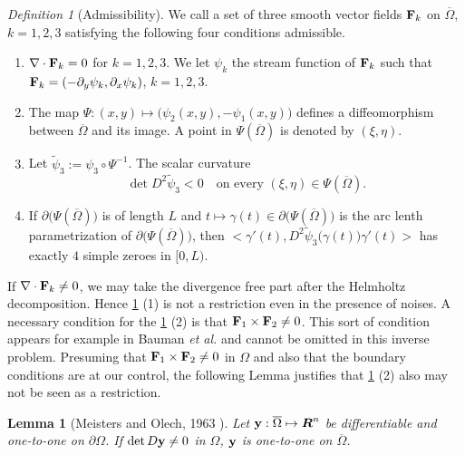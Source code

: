 \documentclass[11pt]{amsart}
\theoremstyle{plain}
\newtheorem{Lem}[Thm]{Lemma}
\theoremstyle{remark}
\newtheorem{Def}[Thm]{Definition}
\numberwithin{equation}{section}
\numberwithin{Thm}{section}
\def\R{\mbox{\boldmath$R$}}
\def\F{{\bf F}}
\def\y{{\bf y}}
\begin{document}
\begin{Def}[Admissibility] \label{def:adm3} We call a set of three smooth vector fields $\F_k$ on $\overline\Omega$, $k=1,2,3$ satisfying the following four conditions admissible.
\begin{enumerate}
  \item $\nabla\cdot\F_k=0$ for $k=1,2,3$. We let $\psi_k$ the stream function of $\F_k$ such that $\F_k=(-\partial_y\psi_k,\partial_x\psi_k)$, $k=1,2,3$.
   \item The map $\Psi: (x,y) \mapsto \big(\psi_2(x,y), -\psi_1(x,y)\big)$ defines a diffeomorphism between $\overline\Omega$ and its image. A point in $\Psi(\overline\Omega)$ is denoted by $(\xi,\eta)$. %
%    
  \item \label{strict} Let $\tilde{\psi}_3:=\psi_3 \circ \Psi^{-1}$. The scalar curvature
\begin{equation}\label{strictInquality}
\det D^2_{}\tilde{\psi}_3  < 0 \quad \text{on every $(\xi,\eta) \in \Psi(\overline\Omega)$.}
\end{equation}
  \item If $\partial\big( \Psi(\overline\Omega)\big)$ is of length $L$ and $t \mapsto \gamma(t)\in \partial\big( \Psi(\overline\Omega)\big)$ is the arc lenth parametrization of  $\partial\big( \Psi(\overline\Omega)\big)$, then $\big<\gamma'(t), D^2 \tilde\psi_3\big(\gamma(t)\big)\gamma'(t)\big>$ has exactly $4$ simple zeroes in $[0,L)$.
\end{enumerate}
\end{Def}

If $\nabla\cdot\F_k\ne0$, we may take the divergence free part after the Helmholtz decomposition. Hence \ref{def:adm3} (1)  is not a restriction even in the presence of noises. A necessary condition for the \ref{def:adm3} (2) is that $\F_1 \times \F_2 \ne 0$. This sort of condition appears for example in Bauman \emph{et al.} \cite{MR1871388} and cannot be omitted in this inverse problem. Presuming that $\F_1 \times \F_2 \ne 0$ in $\Omega$ and also that the boundary conditions are at our control, the following Lemma justifies that  \ref{def:adm3} (2) also may not be seen as a restriction.

 \begin{Lem}[Meisters and Olech, 1963 \cite{meisters_locally_1963}] \label{lemma:bijection} Let $\y:\overline\Omega\mapsto\R^n$ be differentiable and one-to-one on $\partial\Omega$. If $\det D\y \ne0$ in $\Omega$, $\y$ is one-to-one on $\overline\Omega$.
\end{Lem}
\end{document}
